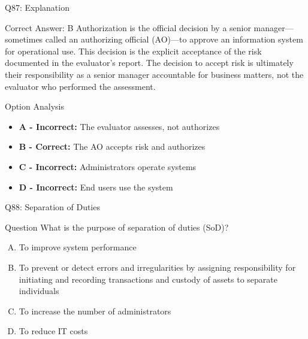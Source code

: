\documentclass{beamer}
\begin{document}
	\begin{frame}{Q87: Explanation}
		\begin{block}{Correct Answer: B}
			Authorization is the official decision by a senior manager—sometimes called an authorizing official (AO)—to approve an information system for operational use. This decision is the explicit acceptance of the risk documented in the evaluator's report. The decision to accept risk is ultimately their responsibility as a senior manager accountable for business matters, not the evaluator who performed the assessment.
		\end{block}
		\begin{block}{Option Analysis}
			\begin{itemize}
				\item \textbf{A - Incorrect:} The evaluator assesses, not authorizes
				\item \textbf{B - Correct:} The AO accepts risk and authorizes
				\item \textbf{C - Incorrect:} Administrators operate systems
				\item \textbf{D - Incorrect:} End users use the system
			\end{itemize}
		\end{block}
	\end{frame}
	
	\begin{frame}{Q88: Separation of Duties}
		\begin{block}{Question}
			What is the purpose of separation of duties (SoD)?
		\end{block}
		\begin{enumerate}[(A)]
			\item To improve system performance
			\item To prevent or detect errors and irregularities by assigning responsibility for initiating and recording transactions and custody of assets to separate individuals
			\item To increase the number of administrators
			\item To reduce IT costs
		\end{enumerate}
	\end{frame}
	
\end{document}
